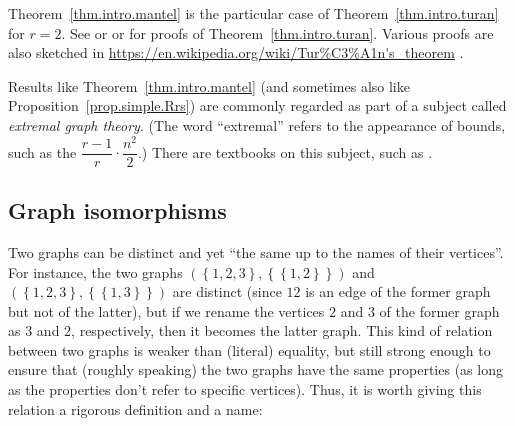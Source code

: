 \documentclass[numbers=enddot,12pt,final,onecolumn,notitlepage]{scrartcl}%
\theoremstyle{definition}
\newcommand{\set}[1]{\left\{ #1 \right\}}
\newcommand{\tup}[1]{\left( #1 \right)}
\begin{document}
Theorem~\ref{thm.intro.mantel} is the particular case of
Theorem~\ref{thm.intro.turan} for $r = 2$. See
\cite[Chapter 4, Theorem 4.8]{Jukna11} or
\cite{Aigner95} or \cite[Chapter 41]{AigZie} for proofs of
Theorem~\ref{thm.intro.turan}.
Various proofs are also sketched in
\url{https://en.wikipedia.org/wiki/Tur%C3%A1n's_theorem} .

Results like Theorem~\ref{thm.intro.mantel} (and sometimes also like
Proposition~\ref{prop.simple.Rrs}) are commonly regarded as part of
a subject called \textit{extremal graph theory}. (The word
``extremal'' refers to the appearance of bounds, such as the
$\dfrac{r-1}{r} \cdot \dfrac{n^2}{2}$.) There are textbooks on this
subject, such as \cite{Jukna11}.

\subsection{\label{sect.intro.iso}Graph isomorphisms}

Two graphs can be distinct and yet ``the same up to the names of their
vertices''. For instance, the two graphs
$\tup{\set{1,2,3},\set{\set{1,2}}}$ and
$\tup{\set{1,2,3},\set{\set{1,3}}}$ are distinct (since $12$ is an
edge of the former graph but not of the latter), but if we rename the
vertices $2$ and $3$ of the former graph as $3$ and $2$, respectively,
then it becomes the latter graph. This kind of relation between two
graphs is weaker than (literal) equality, but still strong enough to
ensure that (roughly speaking) the two graphs have the same properties
(as long as the properties don't refer to specific vertices). Thus,
it is worth giving this relation a rigorous definition and a name:
\end{document}
